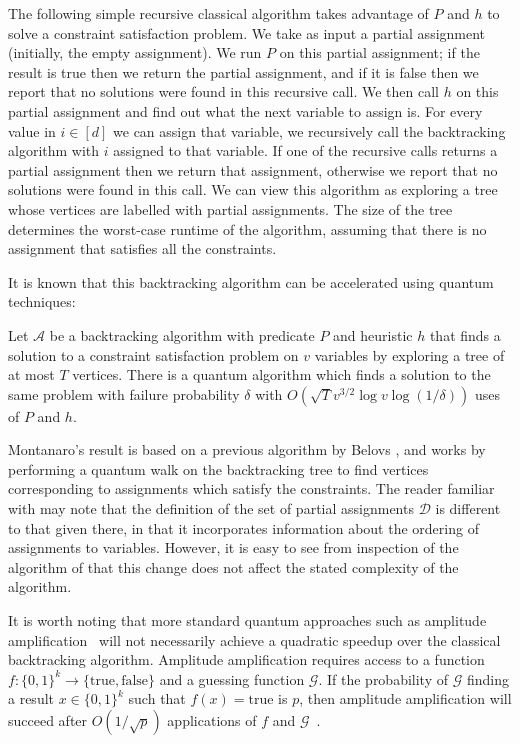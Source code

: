 The following simple recursive classical algorithm takes advantage of $P$ and $h$ to solve a constraint satisfaction problem. We take as input a partial assignment (initially, the empty assignment). We run $P$ on this partial assignment; if the result is true then we return the partial assignment, and if it is false then we report that no solutions were found in this recursive call. We then call $h$ on this partial assignment and find out what the next variable to assign is. For every value in $i \in [d]$ we can assign that variable, we recursively call the backtracking algorithm with $i$ assigned to that variable. If one of the recursive calls returns a partial assignment then we return that assignment, otherwise we report that no solutions were found in this call. We can view this algorithm as exploring a tree whose vertices are labelled with partial assignments. The size of the tree determines the worst-case runtime of the algorithm, assuming that there is no assignment that satisfies all the constraints.

It is known that this backtracking algorithm can be accelerated using quantum techniques:

\begin{theorem}
\label{thm:backtrack}
Let $\mathcal{A}$ be a backtracking algorithm with predicate $P$ and heuristic $h$ that finds a solution to a constraint satisfaction problem on $v$ variables by exploring a tree of at most $T$ vertices. There is a quantum algorithm which finds a solution to the same problem with failure probability $\delta$ with $O(\sqrt{T}v^{3/2}\log v\log(1/\delta))$ uses of $P$ and $h$.
\end{theorem}

Montanaro's result is based on a previous algorithm by Belovs \cite{belovs2013,belovs13a}, and works by performing a quantum walk on the backtracking tree to find vertices corresponding to assignments which satisfy the constraints. The reader familiar with \cite{montanaro2015} may note that the definition of the set of partial assignments $\mathcal{D}$ is different to that given there, in that it incorporates information about the ordering of assignments to variables. However, it is easy to see from inspection of the algorithm of \cite{montanaro2015} that this change does not affect the stated complexity of the algorithm.

It is worth noting that more standard quantum approaches such as amplitude amplification~\cite{brassard1997} will not necessarily achieve a quadratic speedup over the classical backtracking algorithm. Amplitude amplification requires access to a function $f \colon \{0,1\}^k \rightarrow \{\text{true}, \text{false}\}$ and a guessing function $\mathcal{G}$. If the probability of $\mathcal{G}$ finding a result $x \in \{0,1\}^k$ such that $f(x) = \text{true}$ is $p$, then amplitude amplification will succeed after $O(1/\sqrt{p})$ applications of $f$ and $\mathcal{G}$~\cite{brassard1997}.


